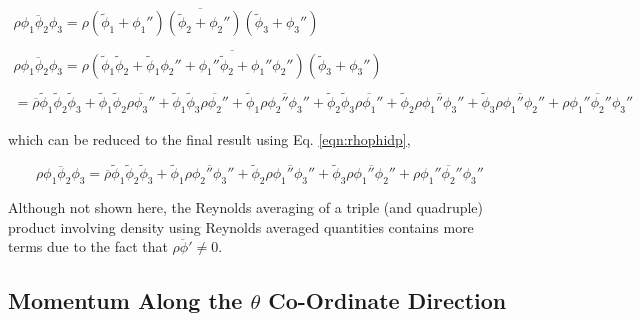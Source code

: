 \begin{displaymath}
	\begin{array}{c}
		\overline{\rho \phi_1 \phi_2 \phi_3} = \overline{\rho (\tilde \phi_1 + \phi_1'')(\tilde \phi_2 + \phi_2'')
			(\tilde \phi_3 + \phi_3'')} \\ \\
		\overline{\rho \phi_1 \phi_2 \phi_3} = \overline{\rho (\tilde \phi_1\tilde \phi_2 + \tilde \phi_1\phi_2''
			+ \phi_1''\tilde \phi_2 + \phi_1''\phi_2'')(\tilde \phi_3 + \phi_3'')} \\ \\
		= \overline{\rho}\tilde \phi_1\tilde \phi_2\tilde \phi_3 + \tilde \phi_1\tilde \phi_2
		\overline{\rho\phi_3''} + \tilde \phi_1\tilde \phi_3\overline{\rho \phi_2''} + \tilde \phi_1
		\overline{\rho \phi_2''\phi_3''} + \tilde \phi_2\tilde \phi_3\overline{\rho\phi_1''} +
		\tilde \phi_2\overline{\rho\phi_1''\phi_3''} + \tilde \phi_3\overline{\rho\phi_1''\phi_2''}
		+\overline{\rho\phi_1''\phi_2''\phi_3''}
	\end{array}
\end{displaymath}
	
	which can be reduced to the final result using Eq. \ref{eqn:rhophidp},

\begin{equation}
	\overline{\rho \phi_1 \phi_2 \phi_3} = \overline{\rho}\tilde \phi_1\tilde \phi_2\tilde \phi_3 + 
		\tilde \phi_1\overline{\rho \phi_2''\phi_3''} +
		\tilde \phi_2\overline{\rho\phi_1''\phi_3''} + \tilde \phi_3\overline{\rho\phi_1''\phi_2''}
		+\overline{\rho\phi_1''\phi_2''\phi_3''}
\label{eqn:quadprod}
\end{equation}

	Although not shown here, the Reynolds averaging of a triple (and quadruple) product involving density 
using Reynolds averaged quantities contains more terms due to the fact that $\overline{\rho \phi'} \not= 0$.

\subsection{Momentum Along the $\theta$ Co-Ordinate Direction}

